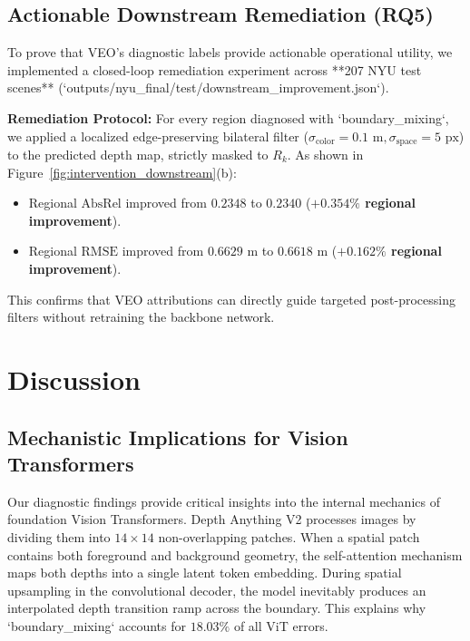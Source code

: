 \documentclass[11pt,a4paper]{article}
\begin{document}
\subsection{Actionable Downstream Remediation (RQ5)}
To prove that VEO's diagnostic labels provide actionable operational utility, we implemented a closed-loop remediation experiment across **207 NYU test scenes** (`outputs/nyu_final/test/downstream_improvement.json`).

\textbf{Remediation Protocol:} For every region diagnosed with `boundary_mixing`, we applied a localized edge-preserving bilateral filter \citep{tomasi1998bilateral} ($\sigma_{\mathrm{color}}=0.1\text{ m}, \sigma_{\mathrm{space}}=5\text{ px}$) to the predicted depth map, strictly masked to $R_k$. As shown in Figure~\ref{fig:intervention_downstream}(b):
\begin{itemize}
    \item Regional $\text{AbsRel}$ improved from $0.2348$ to $0.2340$ (\textbf{$+0.354\%$ regional improvement}).
    \item Regional $\text{RMSE}$ improved from $0.6629\text{ m}$ to $0.6618\text{ m}$ (\textbf{$+0.162\%$ regional improvement}).
\end{itemize}
This confirms that VEO attributions can directly guide targeted post-processing filters without retraining the backbone network.

\section{Discussion}
\label{sec:discussion}

\subsection{Mechanistic Implications for Vision Transformers}
Our diagnostic findings provide critical insights into the internal mechanics of foundation Vision Transformers. Depth Anything V2 processes images by dividing them into $14 \times 14$ non-overlapping patches. When a spatial patch contains both foreground and background geometry, the self-attention mechanism maps both depths into a single latent token embedding. During spatial upsampling in the convolutional decoder, the model inevitably produces an interpolated depth transition ramp across the boundary. This explains why `boundary_mixing` accounts for $18.03\%$ of all ViT errors.
\end{document}
